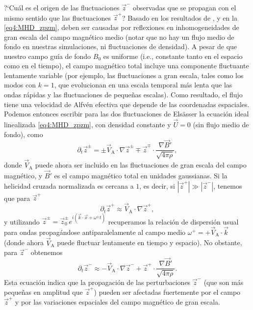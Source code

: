 ?`Cuál es el origen de las fluctuaciones $\vec{z}^-$ observadas que se
propagan con el mismo sentido que las fluctuaciones $\vec{z}^+$?
Basado en los resultados de \cite{hollweg_1990_wkb}, y en la
\cref{eq4:MHD_zpzm}, deben ser causadas por reflexiones en
inhomogeneidades de gran escala del campo magnético medio (notar que
no hay un flujo medio de fondo en nuestras simulaciones, ni
fluctuaciones de densidad). A pesar de que nuestro campo guía de
fondo $B_0$ es uniforme (i.e., constante tanto en el espacio como en
el tiempo), el campo magnético total incluye una componente fluctuante
lentamente variable (por ejemplo, las fluctuaciones a gran escala,
tales como los modos con $k=1$, que evolucionan en una escala temporal
más lenta que las ondas rápidas y las fluctuaciones de pequeñas
escalas).  Como resultado, el flujo tiene una velocidad de Alfvén
efectiva que depende de las coordenadas espaciales. Podemos entonces
escribir para las dos fluctuaciones de Els\"asser la ecuación ideal
linealizada \ref{eq4:MHD_zpzm}, con densidad constante y $\vec{U}=0$
(sin flujo medio de fondo), como
\begin{equation}
\partial_t \vec{z}^\pm = \pm \vec{V}_\textrm{A} \cdot \nabla \vec{z}^\pm 
    \mp \vec{z}^\mp \cdot \frac{\nabla \vec{B}'}{\sqrt{4\pi \rho}} ,
\end{equation}
donde $\vec{V}_\textrm{A}$ puede ahora ser incluido en las
fluctuaciones de gran escala del campo magnético, y $\vec{B}'$
es el campo magnético total en unidades gaussianas. Si la
helicidad cruzada normalizada es cercana a $1$, es decir, si
$|\vec{z}^+| \gg |\vec{z}^-|$, tenemos que para $\vec{z}^+$
\begin{equation}
\partial_t \vec{z}^+  \approx \vec{V}_\textrm{A} \cdot \nabla \vec{z}^+ ,
\end{equation}
y utilizando $\vec{z}^\pm = \vec{z}_0^\pm e^{i(\vec{k}\cdot
  \vec{x}+\omega^\pm t)}$ recuperamos la relación de dispersión usual
para ondas propagándose antiparalelamente al campo medio $\omega^+ =
+\vec{V}_\textrm{A} \cdot \vec{k}$ (donde ahora $\vec{V}_\textrm{A}$
puede fluctuar lentamente en tiempo y espacio). No obstante, para
$\vec{z}^-$ obtenemos
\begin{equation}
\partial_t \vec{z}^- \approx - \vec{V}_\textrm{A} \cdot \nabla \vec{z}^- + \vec{z}^+ 
    \cdot \frac{\nabla \vec{B}'}{\sqrt{4\pi \rho}} .
\label{eq4:zmlinear}
\end{equation}
Esta ecuación indica que la propagación de las perturbaciones
$\vec{z}^-$ (que son más pequeñas en amplitud que $\vec{z}^+$) pueden
ser afectadas fuertemente por el campo $\vec{z}^+$ y por las
variaciones espaciales del campo magnético de gran escala.

